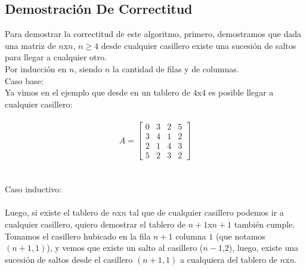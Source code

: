 {{\begin{algorithm}
\begin{algorithmic}[1]
  





 
 \end{algorithmic}
\end{algorithm}

\newpage
\subsection{Demostraci\'on De Correctitud}
Para demostrar la correctitud de este algoritmo, primero, demostramos que dada una matriz de $n$x$n$, $n \geq 4$ desde cualquier casillero existe una sucesión de saltos para llegar a cualquier otro. 
\\
Por inducción en $n$, siendo $n$ la cantidad de filas y de columnas.
\\
Caso base:
\\
Ya vimos en el ejemplo que desde en un tablero de $4$x$4$ es posible llegar a cualquier casillero:
\\
\\
$$A = \begin{bmatrix}
      0 & 3 & 2 & 5   \\[0.3em]
      3 & 4 & 1 & 2   \\[0.3em]
      2 & 1 & 4 & 3   \\[0.3em]
      5 & 2 & 3 & 2 
\end{bmatrix}$$
\\
\\
Caso inductivo:
\\
\\
Luego, si existe el tablero de $n$x$n$ tal que de cualquier casillero podemos ir a cualquier casillero, quiero demostrar el tablero de $n+1$x$n+1$ también cumple.
\\
Tomamos el casillero hubicado en la fila $n+1$ columna $1$ (que notamos $(n+1,1)$), y vemos que existe un salto al casillero ($n-1$,$2$), luego, existe una sucesión de saltos desde el casillero $(n+1,1)$ a cualquiera del tablero de $n$x$n$.
\\
}}
